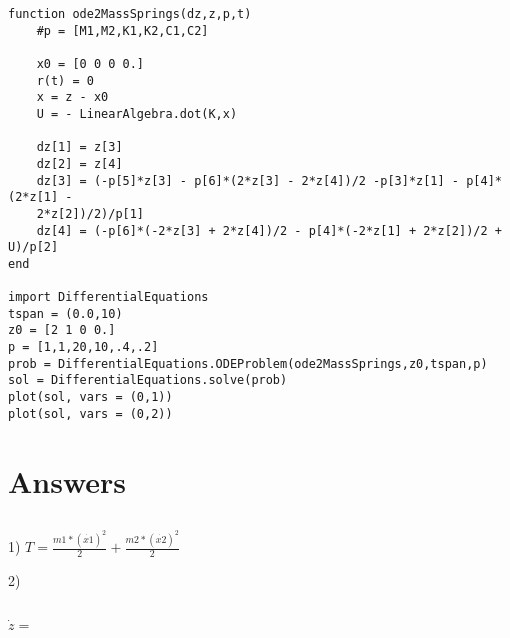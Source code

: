 \documentclass[12pt]{article}
\begin{document}
\begin{verbatim}
function ode2MassSprings(dz,z,p,t)
    #p = [M1,M2,K1,K2,C1,C2]

    x0 = [0 0 0 0.]
    r(t) = 0
    x = z - x0
    U = - LinearAlgebra.dot(K,x)

    dz[1] = z[3]
    dz[2] = z[4]
    dz[3] = (-p[5]*z[3] - p[6]*(2*z[3] - 2*z[4])/2 -p[3]*z[1] - p[4]*(2*z[1] - 
    2*z[2])/2)/p[1]
    dz[4] = (-p[6]*(-2*z[3] + 2*z[4])/2 - p[4]*(-2*z[1] + 2*z[2])/2 + U)/p[2]
end

import DifferentialEquations
tspan = (0.0,10)
z0 = [2 1 0 0.]
p = [1,1,20,10,.4,.2]
prob = DifferentialEquations.ODEProblem(ode2MassSprings,z0,tspan,p)
sol = DifferentialEquations.solve(prob)
plot(sol, vars = (0,1))
plot(sol, vars = (0,2))
\end{verbatim}

\section{Answers}

\subsection{}
1) $T =  \frac{m1*(\dot{x1})^2}{2} + \frac{m2*(\dot{x2})^2}{2} $

2) 


\subsection{}
$\dot{z} = $
\end{document}
